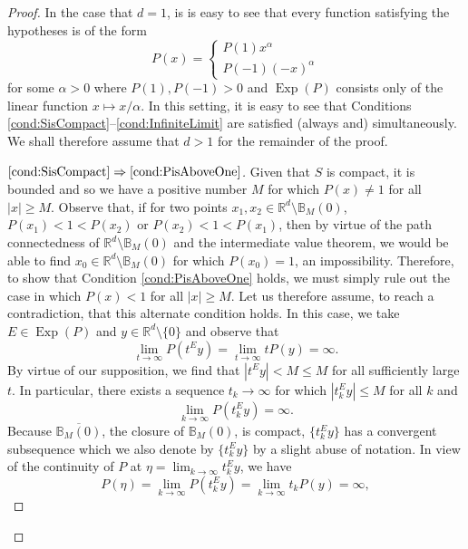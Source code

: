 \documentclass[11pt]{article}
\newcommand*{\myproofname}{Proof}
\newenvironment{subproof}[1][\myproofname]{\begin{proof}[#1]\renewcommand*{\qedsymbol}{$\mathbin{/\mkern-6mu/}$}}{\end{proof}}
\newcommand\Exp{\operatorname{Exp}}
\begin{document}
\begin{proof}
In the case that $d=1$, is is easy to see that every function satisfying the hypotheses is of the form
\begin{equation*}
P(x)=\begin{cases}
P(1)x^\alpha \\
P(-1)(-x)^\alpha
\end{cases}
\end{equation*}
for some $\alpha>0$ where $P(1),P(-1)>0$ and $\Exp(P)$ consists only of the linear function $x\mapsto x/\alpha$. In this setting, it is easy to see that Conditions \ref{cond:SisCompact}--\ref{cond:InfiniteLimit} are satisfied (always and) simultaneously. We shall therefore assume that $d>1$ for the remainder of the proof.

\begin{subproof}[$\ref{cond:SisCompact}\Rightarrow\ref{cond:PisAboveOne}$]
Given that $S$ is compact, it is bounded and so we have a positive number $M$ for which $P(x)\neq 1$ for all $|x|\geq M$. Observe that, if for two points $x_1,x_2\in \mathbb{R}^d\setminus\mathbb{B}_M(0)$, $P(x_1)<1<P(x_2)$ or $P(x_2)<1<P(x_1)$, then by virtue of the path connectedness of $\mathbb{R}^d\setminus\mathbb{B}_M(0)$ and the intermediate value theorem, we would be able to find  $x_0\in\mathbb{R}^d\setminus\mathbb{B}_M(0)$ for which $P(x_0)=1$, an impossibility. Therefore, to show that Condition \ref{cond:PisAboveOne} holds, we must simply rule out the case in which $P(x)<1$ for all $|x|\geq M$. Let us therefore assume, to reach a contradiction, that this alternate condition holds. In this case, we take $E\in\Exp(P)$ and $y\in\mathbb{R}^d\setminus \{0\}$ and observe that
\begin{equation*}
\lim_{t\to\infty}P(t^Ey)=\lim_{t\to\infty}tP(y)=\infty.
\end{equation*}
By virtue of our supposition, we find that $|t^Ey|<M\leq M$ for all sufficiently large $t$. In particular, there exists a sequence $t_k\to\infty$ for which $|t_k^Ey|\leq M$ for all $k$ and 
\begin{equation*}
\lim_{k\to\infty}P(t_k^Ey)=\infty.
\end{equation*}
Because $\overline{\mathbb{B}_M(0)}$, the closure of $\mathbb{B}_M(0)$, is compact, $\{t_k^Ey\}$ has a convergent subsequence which we also denote by $\{t_k^Ey\}$ by a slight abuse of notation. In view of the continuity of $P$ at $\eta=\lim_{k\to\infty}t_k^Ey$, we have
\begin{equation*}
P(\eta)=\lim_{k\to\infty}P(t_k^Ey)=\lim_{k\to\infty}t_kP(y)=\infty,

\end{equation*}
\end{subproof}
\end{proof}
\end{document}
